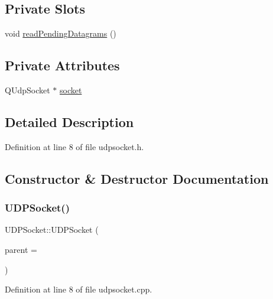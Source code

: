 \subsection*{Private Slots}
\begin{DoxyCompactItemize}
\item 
void \hyperlink{class_u_d_p_socket_a927f0446edc240955bea6e6e493e6621}{read\+Pending\+Datagrams} ()
\end{DoxyCompactItemize}
\subsection*{Private Attributes}
\begin{DoxyCompactItemize}
\item 
Q\+Udp\+Socket $\ast$ \hyperlink{class_u_d_p_socket_a9d27cb09deee765dfec056cfc774c878}{socket}
\end{DoxyCompactItemize}


\subsection{Detailed Description}


Definition at line 8 of file udpsocket.\+h.



\subsection{Constructor \& Destructor Documentation}
\mbox{\label{class_u_d_p_socket_a3d40509e1eb916df5ecbca4d3696c3d2}} 
\subsubsection{\texorpdfstring{U\+D\+P\+Socket()}{UDPSocket()}}
{\footnotesize\ttfamily U\+D\+P\+Socket\+::\+U\+D\+P\+Socket (\begin{DoxyParamCaption}\item[{Q\+Object $\ast$}]{parent = {} }\end{DoxyParamCaption})\hspace{0.3cm}{\ttfamily [explicit]}}



Definition at line 8 of file udpsocket.\+cpp.


